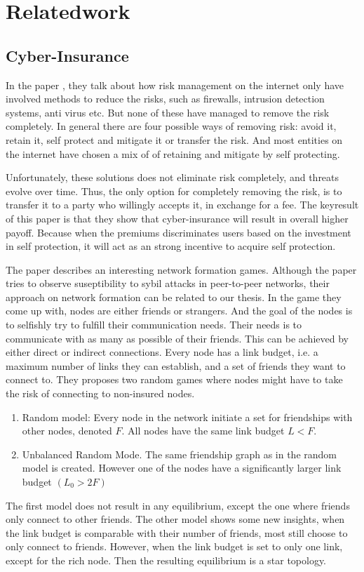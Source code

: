 \chapter{Relatedwork}
\label{chp:relatedwork} 



\section{Cyber-Insurance}


In the paper \cite{bolot2008cyber}, they talk about how risk management on the internet only have involved methods to reduce the risks, such as firewalls, intrusion detection systems, anti virus etc. But none of these have managed to remove the risk completely. In general there are four possible ways of removing risk: avoid it, retain it, self protect and mitigate it or transfer the risk. And most entities on the internet have chosen a mix of of retaining and mitigate by self protecting. 

Unfortunately, these solutions does not eliminate risk completely, and threats evolve over time. Thus, the only option for completely removing the risk, is to transfer it to a party who willingly accepts it, in exchange for a fee. The keyresult of this paper is that they show that cyber-insurance will result in overall higher payoff. Because when the premiums discriminates users based on the investment in self protection, it will act as an strong incentive to acquire self protection. 

The paper \cite{danezis2006network} describes an interesting network formation games. Although the paper tries to observe suseptibility to sybil attacks in peer-to-peer networks, their approach on network formation can be related to our thesis. In the game they come up with, nodes are either friends or strangers. And the goal of the nodes is to selfishly try to fulfill their communication needs. Their needs is to communicate with as many as possible of their friends. This can be achieved by either direct or indirect connections. Every node has a link budget, i.e. a maximum number of links they can establish, and a set of friends they want to connect to. 
They proposes two random games where nodes might have to take the risk of connecting to non-insured nodes.
\begin{enumerate}
\item Random model: Every node in the network initiate a set for friendships with other nodes, denoted $F$. All nodes have the same link budget $L<F$. 
\item Unbalanced Random Mode. The same friendship graph as in the random model is created. However one of the nodes have a significantly larger link budget $(L_{0} > 2 F)$
\end{enumerate}
The first model does not result in any equilibrium, except the one where friends only connect to other friends.
The other model shows some new insights, when the link budget is comparable with their number of friends, most still choose to only connect to friends. However, when the link budget is set to only one link, except for the rich node. Then the resulting equilibrium is a star topology. 

